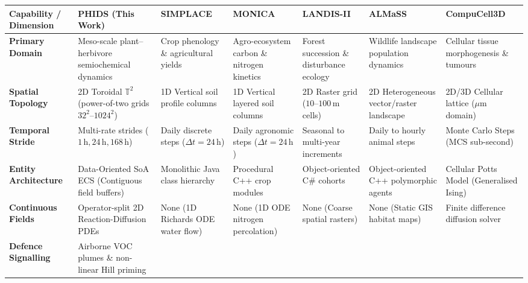 \scriptsize
\renewcommand{\arraystretch}{1.18}
\begin{tabularx}{\textwidth}{
  >{\raggedright\arraybackslash\hsize=1.05\hsize}X
  >{\raggedright\arraybackslash\hsize=1.15\hsize}X
  >{\raggedright\arraybackslash\hsize=0.90\hsize}X
  >{\raggedright\arraybackslash\hsize=0.95\hsize}X
  >{\raggedright\arraybackslash\hsize=0.95\hsize}X
  >{\raggedright\arraybackslash\hsize=0.98\hsize}X
  >{\raggedright\arraybackslash\hsize=1.02\hsize}X
}
  \toprule
  \textbf{Capability / Dimension} &
  \textbf{PHIDS (This Work)} &
  \textbf{SIMPLACE} &
  \textbf{MONICA} &
  \textbf{LANDIS-II} &
  \textbf{ALMaSS} &
  \textbf{CompuCell3D} \\
  \midrule
  \textbf{Primary Domain} &
  Meso-scale plant--herbivore semiochemical dynamics &
  Crop phenology \& agricultural yields &
  Agro-ecosystem carbon \& nitrogen kinetics &
  Forest succession \& disturbance ecology &
  Wildlife landscape population dynamics &
  Cellular tissue morphogenesis \& tumours \\
  \addlinespace[2.5pt]
  \textbf{Spatial Topology} &
  2D Toroidal $\mathbb{T}^2$ (power-of-two grids $32^2\text{--}1024^2$) &
  1D Vertical soil profile columns &
  1D Vertical layered soil columns &
  2D Raster grid ($10\text{--}100\,\text{m}$ cells) &
  2D Heterogeneous vector/raster landscape &
  2D/3D Cellular lattice ($\mu\text{m}$ domain) \\
  \addlinespace[2.5pt]
  \textbf{Temporal Stride} &
  Multi-rate strides ($1\,\text{h}, 24\,\text{h}, 168\,\text{h}$) &
  Daily discrete steps ($\Delta t = 24\,\text{h}$) &
  Daily agronomic steps ($\Delta t = 24\,\text{h}$) &
  Seasonal to multi-year increments &
  Daily to hourly animal steps &
  Monte Carlo Steps (MCS sub-second) \\
  \addlinespace[2.5pt]
  \textbf{Entity Architecture} &
  Data-Oriented SoA ECS (Contiguous field buffers) &
  Monolithic Java class hierarchy &
  Procedural C++ crop modules &
  Object-oriented C\# cohorts &
  Object-oriented C++ polymorphic agents &
  Cellular Potts Model (Generalised Ising) \\
  \addlinespace[2.5pt]
  \textbf{Continuous Fields} &
  Operator-split 2D Reaction-Diffusion PDEs &
  None (1D Richards ODE water flow) &
  None (1D ODE nitrogen percolation) &
  None (Coarse spatial rasters) &
  None (Static GIS habitat maps) &
  Finite difference diffusion solver \\
  \addlinespace[2.5pt]
  \textbf{Defence Signalling} &
  Airborne VOC plumes \& non-linear Hill priming &

\end{tabularx}
